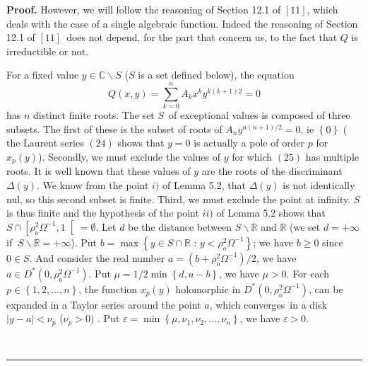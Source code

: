 \documentclass{article}
\newenvironment{proof}[1][Proof]{\textbf{#1.} }{\ \rule{0.5em}{0.5em}}
\begin{document}
\begin{proof}
However, we will follow the reasoning of Section 12.1 of $\left[ 11\right] $, which deals with the case of a single algebraic function. Indeed the
reasoning of Section 12.1 of $\left[ 11\right] $\ does not depend, for the
part that concern us, to the fact that $Q$ is irreductible or not.

For a fixed value $y\in \mathbb{C}\backslash S$ ($S$ is a set defined
below), the equation 
\begin{equation}
Q\left( x,y\right) =\sum_{k=0}^{n}A_{k}x^{k}y^{k\left( k+1\right) 2}=0
\end{equation}
has $n$ distinct finite roots. The set $S$\ of exceptional values is
composed of three subsets. The first of these is the subset of roots of $A_{n}y^{n\left( n+1\right) /2}=0$, ie $\left\{ 0\right\} $ ( the Laurent
series $\left( 24\right) $ shows that $y=0$ is actually a pole of order $p$
for $x_{p}\left( y\right) $). Secondly, we must exclude the values of $y$
for which $\left( 25\right) $ has multiple roots. It is well known that
these values of $y$ are the roots of the discriminant $\Delta \left(
y\right) $. We know from the point $i)$ of Lemma 5.2, that $\Delta \left(
y\right) $ is not identically nul, so this second subset is finite. Third,
we must exclude the point at infinity. $S$ is thus finite and the hypothesis
of the point $ii)$ of Lemma 5.2 shows that $S\cap \left[ \rho _{o}^{2}\Omega
^{-1},1\right[ =\emptyset $. Let $d$ be the distance between $S\backslash 
\mathbb{R}$ and $\mathbb{R}$ (we set $d=+\infty $ if $\ S\backslash \mathbb{R}=+\infty $). Put $b=\max \left\{ y\in S\cap \mathbb{R}\text{ : }y<\rho
_{o}^{2}\Omega ^{-1}\right\} $; we have $b\geq 0$ since $0\in S$. And
consider the real number $a=\left( b+\rho _{o}^{2}\Omega ^{-1}\right) /2$,
we have $a\in D^{\ast }\left( 0,\rho _{o}^{2}\Omega ^{-1}\right) $. Put $\mu
=1/2\min \left\{ d,a-b\right\} $, we have $\mu >0$. For each $p\in \left\{
1,2,...,n\right\} $, the function $x_{p}\left( y\right) $ holomorphic in $D^{\ast }\left( 0,\rho _{o}^{2}\Omega ^{-1}\right) $, can be expanded in a
Taylor series around the point $a$, which converges\ in a disk $\left|
y-a\right| <\nu _{p}$ ($\nu _{p}>0)$ . Put $\varepsilon =\min \left\{ \mu
,\nu _{1},\nu _{2},...,\nu _{n}\right\} $, we have $\varepsilon >0$.


\end{proof}
\end{document}
